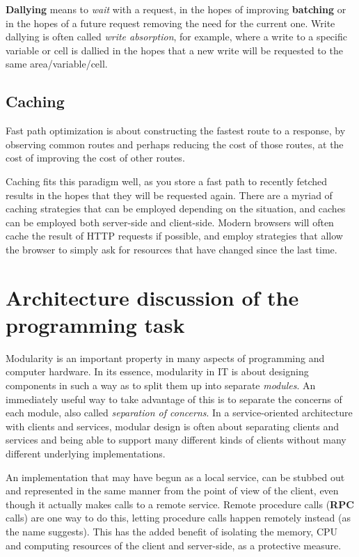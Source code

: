 \textbf{Dallying} means to \textit{wait} with a request, in the hopes of
improving \textbf{batching} or in the hopes of a future request removing the
need for the current one. Write dallying is often called \textit{write
absorption}, for example, where a write to a specific variable or cell is
dallied in the hopes that a new write will be requested to the same
area/variable/cell.

\subsection{Caching}
Fast path optimization is about constructing the fastest route to a response, by
observing common routes and perhaps reducing the cost of those routes, at the
cost of improving the cost of other routes.

Caching fits this paradigm well, as you store a fast path to recently fetched
results in the hopes that they will be requested again. There are a myriad of
caching strategies that can be employed depending on the situation, and caches
can be employed both server-side and client-side. Modern browsers will often
cache the result of HTTP requests if possible, and employ strategies that allow
the browser to simply ask for resources that have changed since the last time.

\section{Architecture discussion of the programming task}
Modularity is an important property in many aspects of programming and computer
hardware. In its essence, modularity in IT is about designing components in such
a way as to split them up into separate \textit{modules}. An immediately useful
way to take advantage of this is to separate the concerns of each module, also
called \textit{separation of concerns}. In a service-oriented architecture with
clients and services, modular design is often about separating clients and
services and being able to support many different kinds of clients without many
different underlying implementations.

An implementation that may have begun as a local service, can be stubbed out and
represented in the same manner from the point of view of the client, even though
it actually makes calls to a remote service. Remote procedure calls (\textbf{RPC} calls) 
are one way to do this, letting procedure calls happen remotely instead (as the
name suggests). This has the added benefit of isolating the memory, CPU and computing resources
of the client and server-side, as a protective measure.

